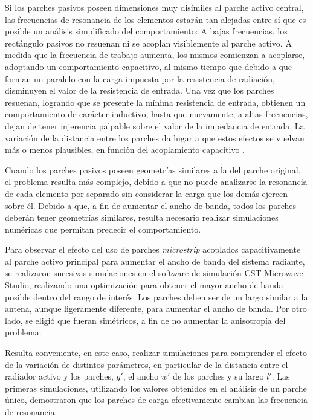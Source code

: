 Si los parches pasivos poseen dimensiones muy disímiles al parche activo central, las frecuencias de resonancia de los elementos estarán tan alejadas entre sí que es posible un análisis simplificado del comportamiento: A bajas frecuencias, los rectángulo pasivos no resuenan ni se acoplan visiblemente al parche activo. A medida que la frecuencia de trabajo aumenta, los mismos comienzan a acoplarse, adoptando un comportamiento capacitivo, al mismo tiempo que debido a que forman un paralelo con la carga impuesta por la resistencia de radiación, disminuyen el valor de la resistencia de entrada. Una vez que los parches resuenan, logrando que se presente la mínima resistencia de entrada, obtienen un comportamiento de carácter inductivo, hasta que nuevamente, a altas frecuencias, dejan de tener injerencia palpable sobre el valor de la impedancia de entrada. La variación de la distancia entre los parches da lugar a que estos efectos se vuelvan más o menos plausibles, en función del acoplamiento capacitivo \cite{Kumar:Non-radiating}.

Cuando los parches pasivos poseen geometrías similares a la del parche original, el problema resulta más complejo, debido a que no puede analizarse la resonancia de cada elemento por separado sin considerar la carga que los demás ejercen sobre él. Debido a que, a fin de aumentar el ancho de banda, todos los parches deberán tener geometrías similares, resulta necesario realizar simulaciones numéricas que permitan predecir el comportamiento.

Para observar el efecto del uso de parches \textit{microstrip} acoplados capacitivamente al parche activo principal para aumentar el ancho de banda del sistema radiante, se realizaron sucesivas simulaciones en el software de simulación CST Microwave Studio, realizando una optimización para obtener el mayor ancho de banda posible dentro del rango de interés. Los parches deben ser de un largo similar a la antena, aunque ligeramente diferente, para aumentar el ancho de banda. Por otro lado, se eligió que fueran simétricos, a fin de no aumentar la anisotropía del problema.

Resulta conveniente, en este caso, realizar simulaciones para comprender el efecto de la variación de distintos parámetros, en particular de la distancia entre el radiador activo y los parches, $g'$, el ancho $w'$ de los parches y su largo $l'$. Las primeras simulaciones, utilizando los valores obtenidos en el análisis de un parche único, demostraron que los parches de carga efectivamente cambian las frecuencia de resonancia. 

